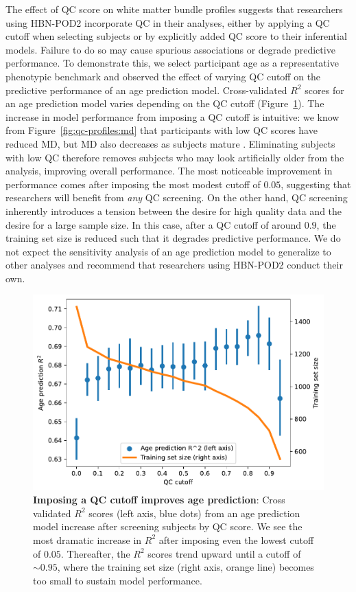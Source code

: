 \documentclass[fleqn,10pt]{wlscirep}
\begin{document}
The effect of QC score on white matter bundle profiles suggests that researchers
using HBN-POD2 incorporate QC in their analyses, either by applying a QC cutoff
when selecting subjects or by explicitly added QC score to their inferential
models. Failure to do so may cause spurious associations or degrade predictive
performance. To demonstrate this, we select participant age as a representative
phenotypic benchmark \cite{cole2019brain,richie-halford2021multidimensional} and
observed the effect of varying QC cutoff on the predictive performance of an age
prediction model. Cross-validated $R^2$ scores for an age prediction model
varies depending on the QC cutoff (Figure~\ref{fig:age-prediction}). The
increase in model performance from imposing a QC cutoff is intuitive: we know
from Figure~\ref{fig:qc-profiles:md} that participants with low QC scores have
reduced MD, but MD also decreases as subjects mature
\cite{yeatman2014lifespan,richie-halford2021multidimensional}. Eliminating
subjects with low QC therefore removes subjects who may look artificially older
from the analysis, improving overall performance. The most noticeable
improvement in performance comes after imposing the most modest cutoff of
$0.05$, suggesting that researchers will benefit from \emph{any} QC screening.
On the other hand, QC screening inherently introduces a tension between the
desire for high quality data and the desire for a large sample size. In this
case, after a QC cutoff of around $0.9$, the training set size is reduced such
that it degrades predictive performance. We do not expect the sensitivity
analysis of an age prediction model to generalize to other analyses and
recommend that researchers using HBN-POD2 conduct their own.

\begin{figure}[htbp]
    \centering
    \includegraphics[width=0.5\linewidth]{age-prediction/qc_sweep.pdf}
    \caption{%
        {\bf Imposing a QC cutoff improves age prediction}:
        Cross validated $R^2$ scores (left axis, blue dots) from an age
        prediction model increase after screening subjects by QC score. We see
        the most dramatic increase in $R^2$ after imposing even the lowest
        cutoff of $0.05$. Thereafter, the $R^2$ scores trend upward until a
        cutoff of $\sim 0.95$, where the training set size (right axis, orange
        line) becomes too small to sustain model performance.
    }
    \label{fig:age-prediction}
\end{figure}
\end{document}
